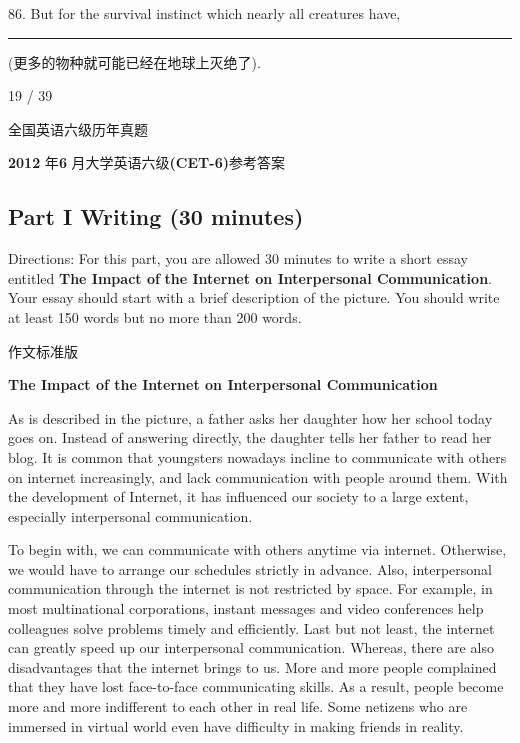 \documentclass[UTF8,11pt]{ctexart}
\begin{document}
86. But for the survival instinct which nearly all creatures have, \par\noindent\rule{.95\linewidth}{.4pt}\par


(更多的物种就可能已经在地球上灭绝了).


19 / 39


全国英语六级历年真题


\textbf{2012} 年\textbf{6} 月大学英语六级\textbf{(CET-6)}参考答案


\subsection*{\textbf{Part} I \textbf{Writing} \textbf{(30 minutes)}}


Directions: For this part, you are allowed 30 minutes to write a short essay entitled\textbf{ The Impact of} \textbf{the Internet on Interpersonal Communication}. Your essay should start with a brief description of the picture. You should write at least 150 words but no more than 200 words.


作文标准版


\textbf{The Impact of the Internet on Interpersonal Communication}


As is described in the picture, a father asks her daughter how her school today goes on. Instead of answering directly, the daughter tells her father to read her blog. It is common that youngsters nowadays incline to communicate with others on internet increasingly, and lack communication with people around them. With the development of Internet, it has influenced our society to a large extent, especially interpersonal communication.


To begin with, we can communicate with others anytime via internet. Otherwise, we would have to arrange our schedules strictly in advance. Also, interpersonal communication through the internet is not restricted by space. For example, in most multinational corporations, instant messages and video conferences help colleagues solve problems timely and efficiently. Last but not least, the internet can greatly speed up our interpersonal communication. Whereas, there are also disadvantages that the internet brings to us. More and more people complained that they have lost face-to-face communicating skills. As a result, people become more and more indifferent to each other in real life. Some netizens who are immersed in virtual world even have difficulty in making friends in reality.
\end{document}
